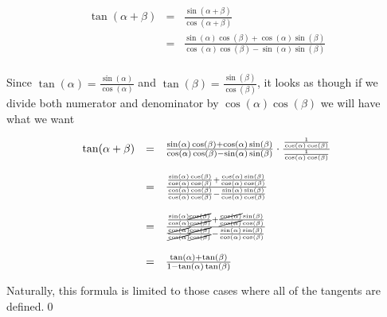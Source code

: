 \documentclass{ximera}
\begin{document}
\begin{example}
\begin{enumerate}
\vspace{-.1in}

\[ \begin{array}{rcl}

\tan(\alpha + \beta) & = &  \frac{\sin(\alpha + \beta)}{\cos(\alpha + \beta)} \\  
                     & = &  \frac{\sin(\alpha) \cos(\beta) + \cos(\alpha) \sin(\beta)}{\cos(\alpha) \cos(\beta) - \sin(\alpha) \sin(\beta)} \\ \end{array} \]
			

Since  $\tan(\alpha) = \frac{\sin(\alpha)}{\cos(\alpha)}$ and $\tan(\beta) = \frac{\sin(\beta)}{\cos(\beta)}$, it looks as though if we divide both numerator and denominator by $\cos(\alpha) \cos(\beta)$ we will have what we want

\vspace{-.1in}

\[ \begin{array}{rcl}

\tan(\alpha + \beta) & = &  \frac{\sin(\alpha) \cos(\beta) + \cos(\alpha) \sin(\beta)}{\cos(\alpha) \cos(\beta) - \sin(\alpha) \sin(\beta)} \cdot \frac{ \frac{1}{\cos(\alpha) \cos(\beta)}}{ \frac{1}{\cos(\alpha) \cos(\beta)}}\\
                    &   & \\
 										& = &  \frac{ \frac{\sin(\alpha) \cos(\beta)}{\cos(\alpha) \cos(\beta)} +  \frac{\cos(\alpha) \sin(\beta)}{\cos(\alpha) \cos(\beta)}}{ \frac{\cos(\alpha) \cos(\beta)}{\cos(\alpha) \cos(\beta)} -  \frac{\sin(\alpha) \sin(\beta)}{\cos(\alpha) \cos(\beta)}}\\
                    &   & \\
										& = &  \frac{ \frac{\sin(\alpha) \cancel{\cos(\beta)}}{\cos(\alpha) \cancel{\cos(\beta)}} +  \frac{\cancel{\cos(\alpha)} \sin(\beta)}{\cancel{\cos(\alpha)} \cos(\beta)}}{ \frac{\cancel{\cos(\alpha)} \cancel{\cos(\beta)}}{\cancel{\cos(\alpha)} \cancel{\cos(\beta)}} -  \frac{\sin(\alpha) \sin(\beta)}{\cos(\alpha) \cos(\beta)}}\\
                    &   & \\
										& = &  \frac{\tan(\alpha) + \tan(\beta)}{1 -\tan(\alpha) \tan(\beta)}\\
\end{array} \]

Naturally, this formula is limited to those cases where all of the tangents are defined.\qed

\end{enumerate}

\end{example}
\end{document}
